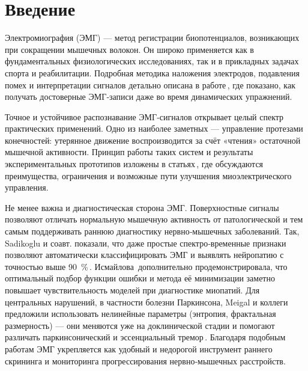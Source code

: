 \documentclass[a4paper,12pt]{article}
\begin{document}
\renewcommand{\contentsname}{Содержание}
\tableofcontents

\newpage

\section*{Введение}

Электромиография (ЭМГ) — метод регистрации биопотенциалов, возникающих при сокращении мышечных волокон. Он широко применяется как в фундаментальных физиологических исследованиях, так и в прикладных задачах спорта и реабилитации. Подробная методика наложения электродов, подавления помех и интерпретации сигналов детально описана в работе\,\cite{kostyuchenko2007}, где показано, как получать достоверные ЭМГ‑записи даже во время динамических упражнений.

Точное и устойчивое распознавание ЭМГ‑сигналов открывает целый спектр практических применений. Одно из наиболее заметных — управление протезами конечностей: утерянное движение воспроизводится за счёт «чтения» остаточной мышечной активности. Принцип работы таких систем и результаты экспериментальных прототипов изложены в статьях\,\cite{sudarsan2012,parajuli2019}, где обсуждаются преимущества, ограничения и возможные пути улучшения миоэлектрического управления.

Не менее важна и диагностическая сторона ЭМГ. Поверхностные сигналы позволяют отличать нормальную мышечную активность от патологической и тем самым поддерживать раннюю диагностику нервно‑мышечных заболеваний. Так, Sadikoglu и соавт. показали, что даже простые спектро‑временные признаки позволяют автоматически классифицировать ЭМГ и выявлять нейропатию с точностью выше 90~\%\,\cite{sadikoglu2017}. Исмайлова\,\cite{ismailova2019} дополнительно продемонстрировала, что оптимальный подбор функции ошибки и метода её минимизации заметно повышает чувствительность моделей при диагностике миопатий. Для центральных нарушений, в частности болезни Паркинсона, Meigal и коллеги предложили использовать нелинейные параметры (энтропия, фрактальная размерность) — они меняются уже на доклинической стадии и помогают различать паркинсонический и эссенциальный тремор\,\cite{meigal2013}. Благодаря подобным работам ЭМГ укрепляется как удобный и недорогой инструмент раннего скрининга и мониторинга прогрессирования нервно‑мышечных расстройств.
\end{document}
